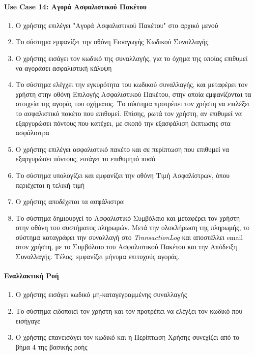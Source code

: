 \documentclass{../ol-softwaremanual}
\begin{document}
	\paragraph{\en Use Case 14: \gr Αγορά Ασφαλιστικού Πακέτου}
	\begin{enumerate}
		\item Ο χρήστης επιλέγει \en"\gr Αγορά Ασφαλιστικού Πακέτου\en" \gr στο αρχικό μενού
		\item Το σύστημα εμφανίζει την οθόνη Εισαγωγής Κωδικού Συναλλαγής
		\item Ο χρήστης εισάγει τον κωδικό της συναλλαγής, για το όχημα της οποίας επιθυμεί να αγοράσει ασφαλιστική κάλυψη
		\item Το σύστημα ελέγχει την εγκυρότητα του κωδικού συναλλαγής, και μεταφέρει τον χρήστη στην οθόνη Επιλογής Ασφαλιστικού Πακέτου, στην οποία εμφανίζονται τα στοιχεία της αγοράς του οχήματος. Το σύστημα προτρέπει τον χρήστη να επιλέξει το ασφαλιστικό πακέτο που επιθυμεί. Επίσης, ρωτά τον χρήστη, αν επιθυμεί να εξαργυρώσει πόντους που κατέχει, με σκοπό την εξασφάλιση έκπτωσης στα ασφάλιστρα
		\item Ο χρήστης επιλέγει ασφαλιστικό πακέτο και σε περίπτωση που επιθυμεί να εξαργυρώσει πόντους, εισάγει το επιθυμητό ποσό
		\item Το σύστημα υπολογίζει και εμφανίζει την οθόνη Τιμή Ασφαλίστρων, όπου περιέχεται η τελική τιμή 
		\item Ο χρήστης αποδέχεται τα ασφάλιστρα
		\item Το σύστημα δημιουργεί το Ασφαλιστικό Συμβόλαιο και μεταφέρει τον χρήστη στην οθόνη του συστήματος πληρωμών. Μετά την ολοκλήρωση της πληρωμής, το σύστημα καταγράφει την συναλλαγή στο \en \textit{TransactionLog} \gr και αποστέλλει \en email \gr στον χρήστη, με το Συμβόλαιο του Ασφαλιστικού Πακέτου και την Απόδειξη Συναλλαγής. Τέλος, εμφανίζει μήνυμα επιτυχούς αγοράς.		
	\end{enumerate}
	
	\paragraph{Εναλλακτική Ροή }
	
	\begin{enumerate}
		\item Ο χρήστης εισάγει κωδικό μη-καταγεγραμμένης συναλλαγής
		\item Το σύστημα ειδοποιεί τον χρήστη και τον προτρέπει να ελέγξει τον κωδικό που εισήγαγε
		\item Ο χρήστης επανεισάγει τον κωδικό και η Περίπτωση Χρήσης συνεχίζει από το βήμα 4 της βασικής ροής
	\end{enumerate}
	
\end{document}
